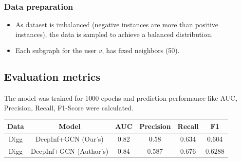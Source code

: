 \subsubsection{Data preparation}
\begin{itemize}
    \item As dataset is imbalanced (negative instances are more than positive instances), the data is sampled to achieve a balanced distribution.
    \item Each subgraph for the user $v$, has fixed neighbors (50).
\end{itemize}

\subsection{Evaluation metrics}
\paragraph{} The model was trained for 1000 epochs and prediction performance like AUC, Precision, Recall, F1-Score were calculated.
\begin{center}
    \begin{tabular}{ |c|c|c|c|c|c| } 
     \hline
     \textbf{Data} & \textbf{Model} & \textbf{AUC} & \textbf{Precision} & \textbf{Recall} & \textbf{F1} \\ 
     \hline
     Digg & DeepInf+GCN (Our's) & 0.82 & 0.58 & 0.634 & 0.604\\ 
     Digg & DeepInf+GCN (Author's) & 0.84 & 0.587 & 0.676 & 0.6288\\ 
     \hline
    \end{tabular}
    \end{center}
